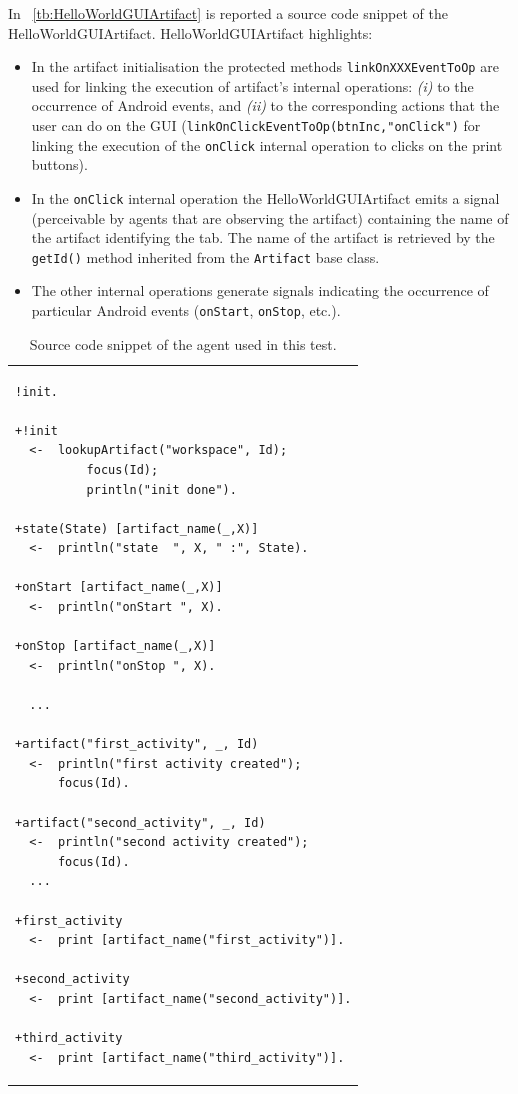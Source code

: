 \documentclass[11pt]{report}
\newcommand\labeltab[1]{\label{tb:#1}}
\newcommand\xt[1]{\tablename~\ref{tb:#1}}
\newcommand\code[1]{{\mbox{\texttt{{#1}}}}}
\newcommand{\jason}{\mbox{\sf{\emph{{Jason}}}}}
\begin{document}
In \xt{HelloWorldGUIArtifact} is reported a source code snippet of the \textsf{HelloWorldGUIArtifact}.
%
\textsf{HelloWorldGUIArtifact} highlights:
\begin{itemize}
%
\item In the artifact initialisation the protected methods \code{linkOnXXXEventToOp} are used for linking the execution of
artifact's internal operations: \textit{(i)} to the occurrence of Android events, and \textit{(ii)} to the corresponding actions that the user can do on the GUI (\code{linkOnClickEventToOp(btnInc,"onClick")} for linking the execution of the \code{onClick} internal operation to clicks on the print buttons).
%
\item In the \code{onClick} internal operation the \textsf{HelloWorldGUIArtifact} emits a signal (perceivable by agents that are observing the artifact) containing the name of the artifact identifying the tab. The name of the artifact is retrieved by the \code{getId()} method inherited from the \code{Artifact} base class.
%
\item The other internal operations generate signals indicating the occurrence of particular Android events (\code{onStart}, \code{onStop}, etc.).
%	
\end{itemize}


\begin{table}[!ht]
\begin{tabular} {p{10cm}}
\begin{minipage}{10cm}
{\scriptsize \begin{verbatim}
!init.

+!init 
  <-  lookupArtifact("workspace", Id);
		  focus(Id);
		  println("init done").

+state(State) [artifact_name(_,X)]
  <-  println("state  ", X, " :", State).

+onStart [artifact_name(_,X)]
  <-  println("onStart ", X).

+onStop [artifact_name(_,X)]
  <-  println("onStop ", X).

  ...

+artifact("first_activity", _, Id)
  <-  println("first activity created"); 
      focus(Id).

+artifact("second_activity", _, Id)
  <-  println("second activity created"); 
      focus(Id).
  ...	
  
+first_activity
  <-  print [artifact_name("first_activity")].
	
+second_activity
  <-  print [artifact_name("second_activity")].
	
+third_activity
  <-  print [artifact_name("third_activity")].
\end{verbatim}}
\end{minipage}
\end{tabular}
\caption{Source code snippet of the \jason{} agent used in this test.}
    \labeltab{test0agent}
\end{table}
\end{document}
